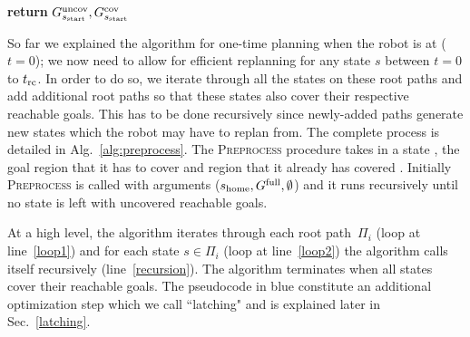 \documentclass[a4paper]{report}
\begin{document}
\begin{algorithm}[t]
\begin{algorithmic}[1]
    \EndFor
\EndFor
\EndIf
\State \textbf{return} $G^{\textrm{uncov}}_{s_{\textrm{start}}}, G^{\textrm{cov}}_{s_{\textrm{start}}}$
\EndProcedure
\end{algorithmic}
\end{algorithm}

%


So far we explained the algorithm for one-time planning when the robot is at \Shome ($t = 0$); we now need to allow for efficient replanning for any state $s$ between $t = 0$ to $t_{\textrm{rc}}$. In order to do so, we iterate through all the states on these root paths and add additional root paths so that these states also cover their respective reachable goals. This has to be done recursively since newly-added paths generate new states which the robot may have to replan from. The complete process is detailed in Alg.~\ref{alg:preprocess}.
The \textsc{Preprocess} procedure takes in a state \Sstart, the goal region that it has to cover \Guncov and region that it already has covered \Gcov. Initially \textsc{Preprocess} is called with arguments ($s_{\textrm{home}}, G^{\textrm{full}}, \emptyset$) and it runs recursively until no state is left with uncovered reachable goals.
%

At a high level, the algorithm iterates through each root path~$\Pi_i$ (loop at line~\ref{loop1}) and for each state $s \in \Pi_i$ (loop at line~\ref{loop2}) the algorithm calls itself recursively (line~\ref{recursion}). The algorithm terminates when all states cover their reachable goals. The pseudocode in blue constitute an additional optimization step which we call ``latching" and is explained later in Sec.~\ref{latching}.
%
\end{document}
